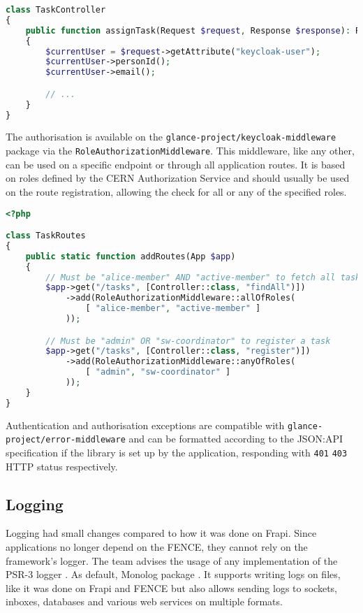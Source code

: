 \begin{lstlisting}[language=PHP,label={code:get-user-example},caption={TODO}]
class TaskController
{
	public function assignTask(Request $request, Response $response): Response
	{
		$currentUser = $request->getAttribute("keycloak-user");
		$currentUser->personId();
		$currentUser->email();

		// ...
	}
}
\end{lstlisting}

The authorisation is available on the \texttt{glance-project/keycloak-middleware} package via the \texttt{RoleAuthorizationMiddleware}. This middleware, like any other, can be used on a specific endpoint or through all application routes. It is based on roles defined by the CERN Authorization Service and should usually be used on the route registration, allowing the check for all or any of the specified roles.

\begin{lstlisting}[language=PHP,caption={TODO}]
<?php

class TaskRoutes 
{
	public static function addRoutes(App $app)
	{
		// Must be "alice-member" AND "active-member" to fetch all tasks
		$app->get("/tasks", [Controller::class, "findAll")])
			->add(RoleAuthorizationMiddleware::allOfRoles(
				[ "alice-member", "active-member" ]
			));

		// Must be "admin" OR "sw-coordinator" to register a task
		$app->get("/tasks", [Controller::class, "register")])
			->add(RoleAuthorizationMiddleware::anyOfRoles(
				[ "admin", "sw-coordinator" ]
			));
	}
}
\end{lstlisting}

Authentication and authorisation exceptions are compatible with \texttt{glance-project/error-middleware} and can be formatted according to the JSON:API specification if the library is set up by the application, responding with \texttt{401} \texttt{403} HTTP status respectively. 

\subsection{Logging}

Logging had small changes compared to how it was done on Frapi. Since applications no longer depend on the FENCE, they cannot rely on the framework's logger. The team advises the usage of any implementation of the PSR-3 logger \cite{psr-3}. As default, Monolog package \cite{monolog}. It supports writing logs on files, like it was done on Frapi and FENCE but also allows sending logs to sockets, inboxes, databases and various web services on multiple formats.

